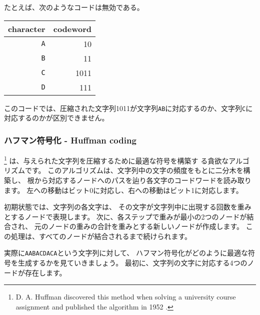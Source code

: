たとえば、次のようなコードは無効である。

\begin{center}
\begin{tabular}{rr}
character & codeword \\
\hline
\texttt{A} & 10 \\
\texttt{B} & 11 \\
\texttt{C} & 1011 \\
\texttt{D} & 111 \\
\end{tabular}
\end{center}
このコードでは、圧縮された文字列1011が文字列\texttt{AB}に対応するのか、文字列\texttt{C}に対応するのかが区別できません。


\subsubsection{ハフマン符号化 - Huffman coding}

\footnote{D. A. Huffman discovered this method
when solving a university course assignment
and published the algorithm in 1952 \cite{huf52}.}
は、与えられた文字列を圧縮するために最適な符号を構築す る貪欲なアルゴリズムです。
このアルゴリズムは、文字列中の文字の頻度をもとに二分木を構築し、
根から対応するノードへのパスを辿り各文字のコードワードを読み取ります。
左への移動はビット0に対応し、右への移動はビット1に対応します。

初期状態では、文字列の各文字は、
その文字が文字列中に出現する回数を重みとするノードで表現します。
次に、各ステップで重みが最小の2つのノードが結合され、
元のノードの重みの合計を重みとする新しいノードが作成します。
この処理は、すべてのノードが結合されるまで続けられます。

実際に\texttt{AABACDACA}という文字列に対して、
ハフマン符号化がどのように最適な符号を生成するかを見ていきましょう。
最初に、文字列の文字に対応する4つのノードが存在します。

\begin{center}
\end{center}

